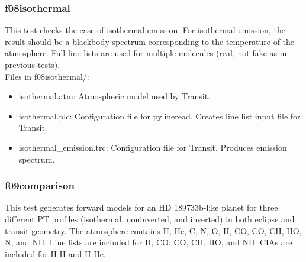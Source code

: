 \documentclass[letterpaper, 12pt]{article}
\begin{document}
\subsubsection{f08isothermal}
\label{sec:isothermal}
This test checks the case of isothermal emission. For isothermal emission, 
the result should be a blackbody spectrum corresponding to the temperature 
of the atmosphere. Full line lists are used for multiple molecules (real, not 
fake as in previous tests).\\

Files in f08isothermal/:
\begin{itemize} \itemsep0pt
  \item isothermal.atm: Atmospheric model used by Transit.
  \item isothermal.plc: Configuration file for pylineread. Creates 
        line list input file for Transit.
  \item isothermal{\_}emission.trc: Configuration file for Transit. Produces 
        emission spectrum.
\end{itemize}

\subsubsection{f09comparison}
\label{sec:comp}
This test generates forward models for an HD 189733b-like planet for three 
different PT profiles (isothermal, noninverted, and inverted) in both 
eclipse and transit geometry. The atmosphere contains H, He, C, N, O, H, 
CO, CO, CH, HO, N, and NH. Line lists are 
included for H, CO, CO, CH, HO, and NH. CIAs 
are included for H-H and H-He.\\
\end{document}
